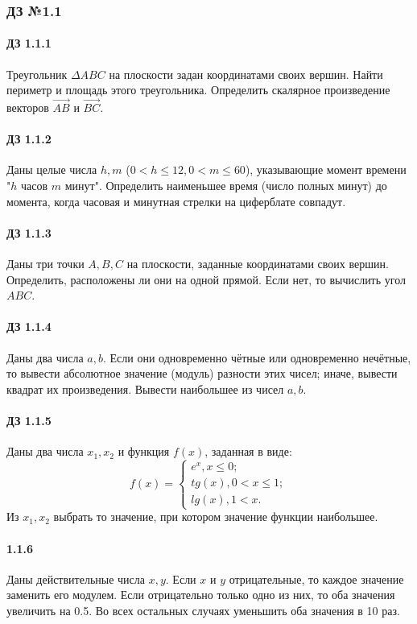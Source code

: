 \documentclass[12pt,a4paper]{report}
\begin{document}
\clearpage
\subsubsection*{ДЗ №1.1}
\paragraph*{ДЗ 1.1.1} Треугольник $\Delta ABC$ на плоскости задан координатами своих вершин. Найти периметр и площадь этого треугольника. Определить скалярное произведение векторов $\overrightarrow{AB}$ и $\overrightarrow{BC}$.
\paragraph*{ДЗ 1.1.2} Даны целые числа $h,m$ ($0 < h \le 12, 0 < m \le 60$), указывающие момент времени "$h$ часов $m$ минут". Определить наименьшее время (число полных минут) до момента, когда часовая и минутная стрелки на циферблате совпадут.
\paragraph*{ДЗ 1.1.3} Даны три точки $A, B, C$ на плоскости, заданные координатами своих вершин. Определить, расположены ли они на одной прямой. Если нет, то вычислить угол $ABC$.
\paragraph*{ДЗ 1.1.4} Даны два числа $a, b$. Если они одновременно чётные или одновременно нечётные, то вывести абсолютное значение (модуль) разности этих чисел; иначе, вывести квадрат их произведения. Вывести наибольшее из чисел $a, b$.
\paragraph*{ДЗ 1.1.5} Даны два числа $x_1, x_2$ и функция $f(x)$, заданная в виде:
\begin{equation*}
 f(x) = 
 \begin{cases}
   e^x, x \le 0; \\
   tg(x), 0 < x \le 1; \\
   lg(x), 1 < x.
 \end{cases}
\end{equation*}
Из $x_1, x_2$ выбрать то значение, при котором значение функции наибольшее.
\paragraph*{1.1.6} Даны действительные числа $x, y$. Если $x$ и $y$ отрицательные, то каждое значение заменить его модулем. Если отрицательно только одно из них, то оба значения увеличить на 0.5. Во всех остальных случаях уменьшить оба значения в 10 раз.
\end{document}
